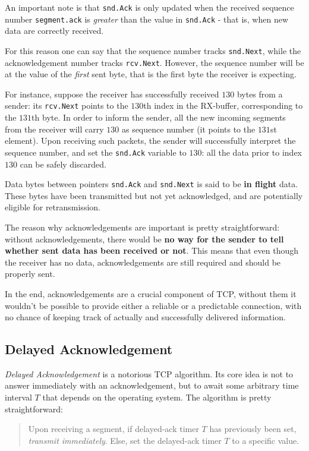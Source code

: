 \documentclass[10pt]{extreport}
\begin{document}
An important note is that \texttt{snd.Ack} is only updated when the received
sequence number \texttt{segment.ack} is \emph{greater} than the value in
\texttt{snd.Ack} \-- that is, when new data are correctly received.

For this reason one can say that the sequence number tracks \texttt{snd.Next},
while the acknowledgement number tracks \texttt{rcv.Next}. However, the
sequence number will be at the value of the \emph{first} sent byte, that is the
first byte the receiver is expecting.

For instance, suppose the receiver has successfully received $130$ bytes from a
sender: its \texttt{rcv.Next} points to the $130$th index in the RX-buffer,
corresponding to the $131$th byte. In order to inform the sender, all the new
incoming segments from the receiver will carry $130$ as sequence number (it
points to the $131$st element). Upon receiving such packets, the sender will
successfully interpret the sequence number, and set the \texttt{snd.Ack}
variable to $130$: all the data prior to index $130$ can be safely discarded.

Data bytes between pointers \texttt{snd.Ack} and \texttt{snd.Next} is said to
be \textbf{in flight} data. These bytes have been transmitted but not yet
acknowledged, and are potentially eligible for retransmission.

The reason why acknowledgements are important is pretty straightforward: without
acknowledgements, there would be \textbf{no way for the sender to tell whether
sent data has been received or not}. This means that even though the receiver
has no data, acknowledgements are still required and should be properly sent.

In the end, acknowledgements are a crucial component of TCP, without them it
wouldn't be possible to provide either a reliable or a predictable connection,
with no chance of keeping track of actually and successfully delivered
information.


\subsection{Delayed Acknowledgement}

\emph{Delayed Acknowledgement} is a notorious TCP algorithm. Its core idea is
not to answer immediately with an acknowledgement, but to await some arbitrary
time interval $T$ that depends on the operating system. The algorithm is pretty
straightforward:

\begin{quote}
Upon receiving a segment, if delayed-ack timer $T$ has previously been set,
\emph{transmit immediately}. Else, set the delayed-ack timer $T$ to a specific
value.
\end{quote}
\end{document}
